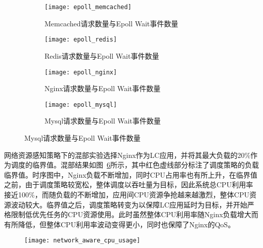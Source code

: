 \begin{figure}[!htbp]
    \centering
    \begin{subfigure}[b]{0.49\textwidth}
        \texttt{[image: epoll\_memcached]}
        \caption{Memcached请求数量与Epoll Wait事件数量}
        \label{fig:epoll_memcached}
    \end{subfigure}
    \begin{subfigure}[b]{0.49\textwidth}
        \texttt{[image: epoll\_redis]}
        \caption{Redis请求数量与Epoll Wait事件数量}
        \label{fig:epoll_redis}
    \end{subfigure}
    \begin{subfigure}[b]{0.49\textwidth}
        \texttt{[image: epoll\_nginx]}
        \caption{Nginx请求数量与Epoll Wait事件数量}
        \label{fig:epoll_nginx}
    \end{subfigure}
    \begin{subfigure}[b]{0.49\textwidth}
        \texttt{[image: epoll\_mysql]}
        \caption{Mysql请求数量与Epoll Wait事件数量}
        \label{fig:epoll_mysql}
    \end{subfigure}
\label{fig:epoll_request}
\end{figure}

网络资源感知策略下的混部实验选择Nginx作为LC应用，并将其最大负载的20\%作为调度的临界值。混部结果如图~\ref{fig:network_aware_cpu_usage}所示，其中红色虚线部分标注了调度策略的负载临界值。时序图中，Nginx负载不断增加，同时CPU占用率也有所上升，在临界值之前，由于调度策略较宽松，整体调度以吞吐量为目标，因此系统总CPU利用率接近100\%，而随负载的不断增加，应用间CPU资源争抢越来越激烈，整体CPU资源波动较大。临界值之后，调度策略转变为以保障LC应用延时为目标，并开始严格限制低优先任务的CPU资源使用。此时虽然整体CPU利用率随Nginx负载增大而有所降低，但整体CPU利用率波动变得更小，同时也保障了Nginx的QoS。

\begin{figure}[H]
    \centering
    \texttt{[image: network\_aware\_cpu\_usage]}
    \label{fig:network_aware_cpu_usage}
\end{figure}


